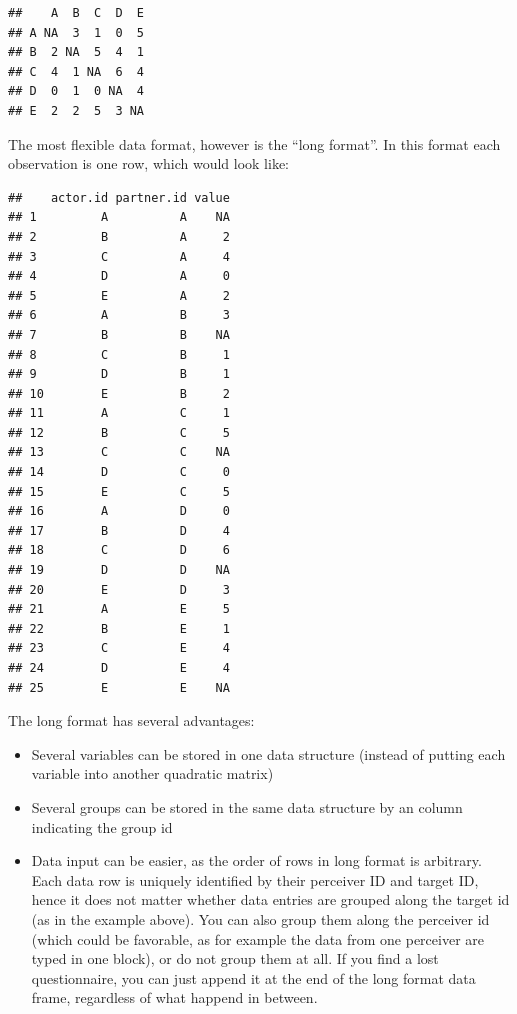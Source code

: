 \documentclass[a4paper]{article}\usepackage[]{graphicx}\usepackage[]{color}
\makeatletter
\newenvironment{kframe}{%
 \def\at@end@of@kframe{}%
 \ifinner\ifhmode%
  \def\at@end@of@kframe{\end{minipage}}%
  \begin{minipage}{\columnwidth}%
 \fi\fi%
 \def\FrameCommand##1{\hskip\@totalleftmargin \hskip-\fboxsep
 \colorbox{shadecolor}{##1}\hskip-\fboxsep
     \hskip-\linewidth \hskip-\@totalleftmargin \hskip\columnwidth}%
 \MakeFramed {\advance\hsize-\width
   \@totalleftmargin\z@ \linewidth\hsize
   \@setminipage}}%
 {\par\unskip\endMakeFramed%
 \at@end@of@kframe}
\newenvironment{knitrout}{}{} %
\makeatother
\begin{document}
\begin{knitrout}\small
{}\color{fgcolor}\begin{kframe}
\begin{verbatim}
##    A  B  C  D  E
## A NA  3  1  0  5
## B  2 NA  5  4  1
## C  4  1 NA  6  4
## D  0  1  0 NA  4
## E  2  2  5  3 NA
\end{verbatim}
\end{kframe}
\end{knitrout}



The most flexible data format, however is the ``long format''. In this format each observation is one row, which would look like:

\begin{knitrout}\small
{}\color{fgcolor}\begin{kframe}
\begin{verbatim}
##    actor.id partner.id value
## 1         A          A    NA
## 2         B          A     2
## 3         C          A     4
## 4         D          A     0
## 5         E          A     2
## 6         A          B     3
## 7         B          B    NA
## 8         C          B     1
## 9         D          B     1
## 10        E          B     2
## 11        A          C     1
## 12        B          C     5
## 13        C          C    NA
## 14        D          C     0
## 15        E          C     5
## 16        A          D     0
## 17        B          D     4
## 18        C          D     6
## 19        D          D    NA
## 20        E          D     3
## 21        A          E     5
## 22        B          E     1
## 23        C          E     4
## 24        D          E     4
## 25        E          E    NA
\end{verbatim}
\end{kframe}
\end{knitrout}


The long format has several advantages:
\begin{itemize}

	\item Several variables can be stored in one data structure (instead of putting each variable into another quadratic matrix)

	\item Several groups can be stored in the same data structure by an column indicating the group id
	
	\item Data input can be easier, as the order of rows in long format is arbitrary. Each data row is uniquely identified by their perceiver ID and target ID, hence it does not matter whether data entries are grouped along the target id (as in the example above). You can also group them along the perceiver id (which could be favorable, as for example the data from one perceiver are typed in one block), or do not group them at all. If you find a lost questionnaire, you can just append it at the end of the long format data frame, regardless of what happend in between.
\end{itemize}
\end{document}
